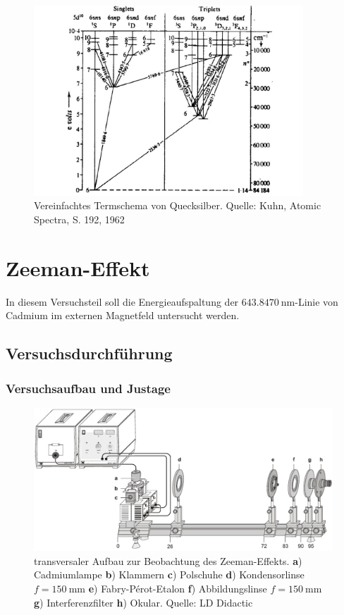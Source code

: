 \documentclass[11pt, a4paper]{article}
\begin{document}
\begin{figure}[!h]
\centering
\includegraphics[width=0.9\textwidth]{./figures/termschema_hg.pdf}
\caption{Vereinfachtes Termschema von Quecksilber. Quelle: Kuhn, Atomic Spectra, S. 192, 1962}
\label{fig:termschema_hg}
\end{figure}

\clearpage

\section{Zeeman-Effekt}
In diesem Versuchsteil soll die Energieaufspaltung der $\SI{643,8470}{\nano\metre}$-Linie von Cadmium im externen Magnetfeld untersucht werden.

\subsection{Versuchsdurchführung}

\subsubsection{Versuchsaufbau und Justage}
\begin{figure}[h]
	\centering
	\includegraphics[width=1.0\textwidth]{./figures/aufbau_zeeman.pdf}
	\caption{transversaler Aufbau zur Beobachtung des Zeeman-Effekts. \textbf{a}) Cadmiumlampe \textbf{b}) Klammern \textbf{c}) Polschuhe \textbf{d}) Kondensorlinse $f=\SI{150}{\milli\metre}$ \textbf{e}) Fabry-Pérot-Etalon \textbf{f}) Abbildungslinse $f=\SI{150}{\milli\metre}$ \textbf{g}) Interferenzfilter \textbf{h}) Okular. Quelle: LD Didactic}
	\label{fig:aufbau_zeeman}
\end{figure}
\end{document}
